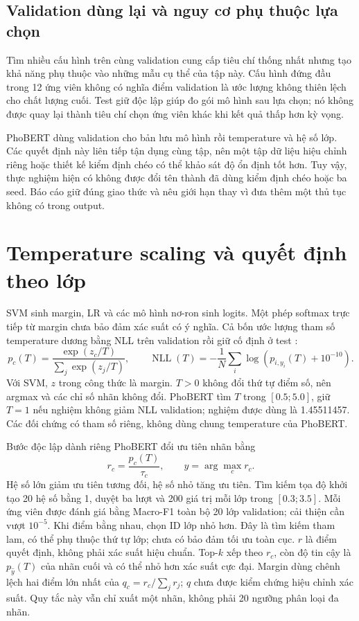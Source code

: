 \FloatBarrier

\subsection{Validation dùng lại và nguy cơ phụ thuộc lựa chọn}
Tìm nhiều cấu hình trên cùng validation cung cấp tiêu chí thống nhất nhưng tạo khả năng phụ thuộc vào những mẫu cụ thể của tập này. Cấu hình đứng đầu trong 12 ứng viên không có nghĩa điểm validation là ước lượng không thiên lệch cho chất lượng cuối. Test giữ độc lập giúp đo gói mô hình sau lựa chọn; nó không được quay lại thành tiêu chí chọn ứng viên khác khi kết quả thấp hơn kỳ vọng.

PhoBERT dùng validation cho bản lưu mô hình rồi temperature và hệ số lớp. Các quyết định này liên tiếp tận dụng cùng tập, nên một tập dữ liệu hiệu chỉnh riêng hoặc thiết kế kiểm định chéo có thể khảo sát độ ổn định tốt hơn. Tuy vậy, thực nghiệm hiện có không được đổi tên thành đã dùng kiểm định chéo hoặc ba seed. Báo cáo giữ đúng giao thức và nêu giới hạn thay vì đưa thêm một thủ tục không có trong output.

\FloatBarrier

\section{Temperature scaling và quyết định theo lớp}
\CalibrationDiagram
SVM sinh margin, LR và các mô hình nơ-ron sinh logits. Một phép softmax trực tiếp từ margin chưa bảo đảm xác suất có ý nghĩa. Cả bốn ước lượng tham số temperature dương bằng NLL trên validation rồi giữ cố định ở test \citep{calibration}:
\begin{equation}
p_c(T)=\frac{\exp(z_c/T)}{\sum_j\exp(z_j/T)},\qquad
\operatorname{NLL}(T)=-\frac1N\sum_i\log(p_{i,y_i}(T)+10^{-10}).
\end{equation}
Với SVM, $z$ trong công thức là margin. $T>0$ không đổi thứ tự điểm số, nên argmax và các chỉ số nhãn không đổi. PhoBERT tìm $T$ trong $[0.5;5.0]$, giữ $T=1$ nếu nghiệm không giảm NLL validation; nghiệm được dùng là 1.45511457. Các đối chứng có tham số riêng, không dùng chung temperature của PhoBERT.

Bước độc lập dành riêng PhoBERT đổi ưu tiên nhãn bằng
\begin{equation}r_c=\frac{p_c(T)}{\tau_c},\qquad\hat y=\arg\max_c r_c.\end{equation}
Hệ số lớn giảm ưu tiên tương đối, hệ số nhỏ tăng ưu tiên. Tìm kiếm tọa độ khởi tạo 20 hệ số bằng 1, duyệt ba lượt và 200 giá trị mỗi lớp trong $[0.3;3.5]$. Mỗi ứng viên được đánh giá bằng Macro-F1 toàn bộ 20 lớp validation; cải thiện cần vượt $10^{-5}$. Khi điểm bằng nhau, chọn ID lớp nhỏ hơn. Đây là tìm kiếm tham lam, có thể phụ thuộc thứ tự lớp; chưa có bảo đảm tối ưu toàn cục.
$r$ là điểm quyết định, không phải xác suất hiệu chuẩn. Top-$k$ xếp theo $r_c$, còn độ tin cậy là $p_{\hat y}(T)$ của nhãn cuối và có thể nhỏ hơn xác suất cực đại. Margin dùng chênh lệch hai điểm lớn nhất của $q_c=r_c/\sum_jr_j$; $q$ chưa được kiểm chứng hiệu chỉnh xác suất. Quy tắc này vẫn chỉ xuất một nhãn, không phải 20 ngưỡng phân loại đa nhãn.

